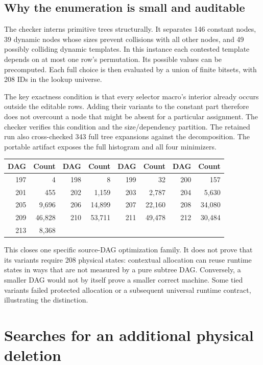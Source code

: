 \documentclass[11pt,a4paper]{article}
\begin{document}
\subsection{Why the enumeration is small and auditable}

The checker interns primitive trees structurally. It separates 146 constant
nodes, 39 dynamic nodes whose sizes prevent collisions with all other
nodes, and 49 possibly colliding dynamic templates. In this instance each
contested template depends on at most one row's permutation. Its possible
values can be precomputed. Each full choice is then evaluated by a union
of finite bitsets, with 208 IDs in the lookup universe.

The key exactness condition is that every selector macro's interior already
occurs outside the editable rows. Adding their variants to the constant
part therefore does not overcount a node that might be absent for a
particular assignment. The checker verifies this condition and the
size/dependency partition. The retained run also cross-checked 343 full
tree expansions against the decomposition. The portable artifact exposes
the full histogram and all four minimizers.

\begin{center}\small
\begin{tabular}{@{}rrrrrrrr@{}}
\toprule
DAG & Count & DAG & Count & DAG & Count & DAG & Count\\
\midrule
197 & 4 & 198 & 8 & 199 & 32 & 200 & 157\\
201 & 455 & 202 & 1,159 & 203 & 2,787 & 204 & 5,630\\
205 & 9,696 & 206 & 14,899 & 207 & 22,160 & 208 & 34,080\\
209 & 46,828 & 210 & 53,711 & 211 & 49,478 & 212 & 30,484\\
213 & 8,368 & & & & & &\\
\bottomrule
\end{tabular}
\end{center}

This closes one specific source-DAG optimization family. It does not prove
that its variants require 208 physical states: contextual allocation can
reuse runtime states in ways that are not measured by a pure subtree DAG.
Conversely, a smaller DAG would not by itself prove a smaller correct
machine. Some tied variants failed protected allocation or a subsequent
universal runtime contract, illustrating the distinction.

\section{Searches for an additional physical deletion}\label{sec:search}
\end{document}
